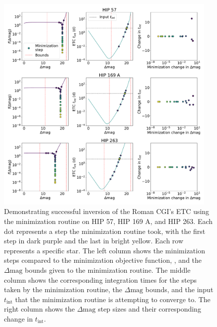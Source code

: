 \begin{figure}
  \begin{center}
    \includegraphics[width=0.95\textwidth]{ch2/figures/minimzation_star_comp.pdf}
  \end{center}
  \caption{Demonstrating successful inversion of the Roman CGI's ETC using the minimization
    routine on HIP 57, HIP 169 A, and HIP 263. Each dot represents a step the
  minimization routine took, with the first step in dark purple and the last in
bright yellow. Each row represents a specific star. The left column shows the
minimization steps compared to the minimization objective function,
, and the $\Delta\textrm{mag}$ bounds given to the
minimization routine. The middle column shows the corresponding integration
times for the steps taken by the minimization routine, the $\Delta\textrm{mag}$
bounds, and the input $t_\textrm{int}$ that the minimization routine is
attempting to converge to. The right column shows the $\Delta\textrm{mag}$ step
sizes and their corresponding change in $t_\textrm{int}$.}
  \label{fig:minimization_star_comp}
\end{figure}

